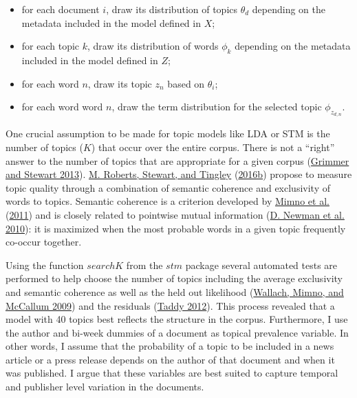 \documentclass[
]{article}
\providecommand{\tightlist}{%
  \setlength{\itemsep}{0pt}\setlength{\parskip}{0pt}}
\begin{document}
\begin{itemize}
\tightlist
\item
  for each document \(i\), draw its distribution of topics \(\theta_d\)
  depending on the metadata included in the model defined in \(X\);
\item
  for each topic \(k\), draw its distribution of words \(\phi_k\)
  depending on the metadata included in the model defined in \(Z\);
\item
  for each word \(n\), draw its topic \(z_n\) based on \(\theta_i\);
\item
  for each word word \(n\), draw the term distribution for the selected
  topic \(\phi_{z_{d,n}}\).
\end{itemize}

One crucial assumption to be made for topic models like LDA or STM is
the number of topics (\(K\)) that occur over the entire corpus. There is
not a ``right'' answer to the number of topics that are appropriate for
a given corpus (\protect\hyperlink{ref-grimmer_text_2013}{Grimmer and
Stewart 2013}). \protect\hyperlink{ref-roberts_stm:_2016}{M. Roberts,
Stewart, and Tingley} (\protect\hyperlink{ref-roberts_stm:_2016}{2016b})
propose to measure topic quality through a combination of semantic
coherence and exclusivity of words to topics. Semantic coherence is a
criterion developed by
\protect\hyperlink{ref-mimno_optimizing_2011}{Mimno et al.}
(\protect\hyperlink{ref-mimno_optimizing_2011}{2011}) and is closely
related to pointwise mutual information
(\protect\hyperlink{ref-newman_automatic_2010}{D. Newman et al. 2010}):
it is maximized when the most probable words in a given topic frequently
co-occur together.

Using the function \(searchK\) from the \(stm\) package several
automated tests are performed to help choose the number of topics
including the average exclusivity and semantic coherence as well as the
held out likelihood
(\protect\hyperlink{ref-wallach_rethinking_2009}{Wallach, Mimno, and
McCallum 2009}) and the residuals
(\protect\hyperlink{ref-taddy_estimation_2012}{Taddy 2012}). This
process revealed that a model with 40 topics best reflects the structure
in the corpus. Furthermore, I use the author and bi-week dummies of a
document as topical prevalence variable. In other words, I assume that
the probability of a topic to be included in a news article or a press
release depends on the author of that document and when it was
published. I argue that these variables are best suited to capture
temporal and publisher level variation in the documents.
\end{document}
